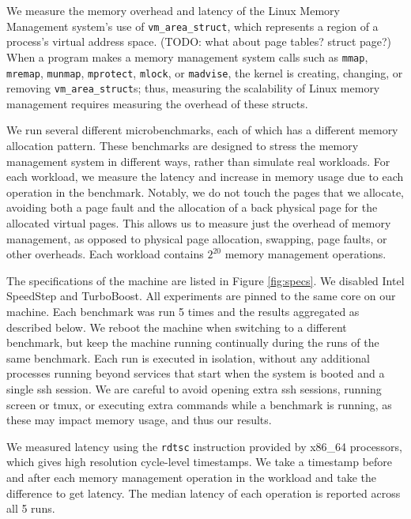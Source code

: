 \documentclass[twocolumn,11pt]{article}
\begin{document}
We measure the memory overhead and latency of the Linux Memory Management
system's use of \texttt{vm\_area\_struct}, which represents a region of a
process's virtual address space. (TODO: what about page tables? struct page?)
When a program makes a memory management system calls such as \texttt{mmap},
\texttt{mremap}, \texttt{munmap}, \texttt{mprotect}, \texttt{mlock}, or
\texttt{madvise}, the kernel is creating, changing, or removing
\texttt{vm\_area\_struct}s; thus, measuring the scalability of Linux memory
management requires measuring the overhead of these structs.

We run several different microbenchmarks, each of which has a different memory
allocation pattern. These benchmarks are designed to stress the memory
management system in different ways, rather than simulate real workloads. For
each workload, we measure the latency and increase in memory usage due to each
operation in the benchmark. Notably, we do not touch the pages that we allocate,
avoiding both a page fault and the allocation of a back physical page for the
allocated virtual pages. This allows us to measure just the overhead of memory
management, as opposed to physical page allocation, swapping, page faults, or
other overheads.  Each workload contains $2^{20}$ memory management operations.

The specifications of the machine are listed in Figure \ref{fig:specs}. We
disabled Intel SpeedStep and TurboBoost. All experiments are pinned to the same
core on our machine. Each benchmark was run 5 times and the results aggregated
as described below. We reboot the machine when switching to a different
benchmark, but keep the machine running continually during the runs of the same
benchmark. Each run is executed in isolation, without any additional processes
running beyond services that start when the system is booted and a single ssh
session. We are careful to avoid opening extra ssh sessions, running screen or
tmux, or executing extra commands while a benchmark is running, as these may
impact memory usage, and thus our results.

We measured latency using the \texttt{rdtsc} instruction provided by x86\_64
processors, which gives high resolution cycle-level timestamps. We take a
timestamp before and after each memory management operation in the workload and
take the difference to get latency. The median latency of each operation is
reported across all 5 runs.
\end{document}

